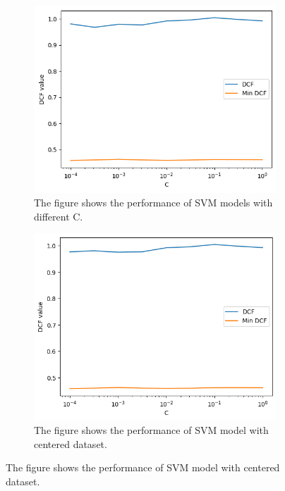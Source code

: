 \documentclass{article}
\begin{document}
\begin{figure}[ht]
    \centering
    \begin{subfigure}[b]{0.45\textwidth}
        \centering
        \includegraphics[width=\textwidth]{images/svm_C.png}
        \caption{The figure shows the performance of SVM models with different C.}
        \label{fig:svm_C}
    \end{subfigure}
    \hfill
    \begin{subfigure}[b]{0.45\textwidth}
        \centering
        \includegraphics[width=\textwidth]{images/svm_C_centered.png}
        \caption{The figure shows the performance of SVM model with centered dataset.}
        \label{fig:svm_C_centered}
    \end{subfigure}
\end{figure}
\end{document}

